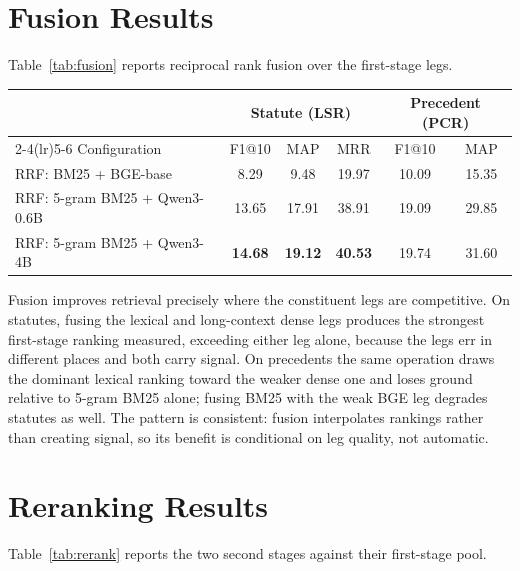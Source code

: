 \documentclass{mnnit}
\makeatletter
\newcommand{\tabcaption}[1]{\def\@captype{table}\caption{#1}}
\makeatother
\begin{document}
\section{Fusion Results}
Table~\ref{tab:fusion} reports reciprocal rank fusion over the
first-stage legs.

\begin{center}
\small
\tabcaption{Reciprocal rank fusion on the development split. The
fused pool is formed from each leg's top ranks at $k=60$.}
\label{tab:fusion}
\vspace{2mm}
\begin{tabular}{lccccc}
\toprule
 & \multicolumn{3}{c}{Statute (LSR)} & \multicolumn{2}{c}{Precedent (PCR)} \\
\cmidrule(lr){2-4}\cmidrule(lr){5-6}
Configuration & F1@10 & MAP & MRR & F1@10 & MAP \\
\midrule
RRF: BM25 + BGE-base & 8.29 & 9.48 & 19.97 & 10.09 & 15.35 \\
RRF: 5-gram BM25 + Qwen3-0.6B & 13.65 & 17.91 & 38.91 & 19.09 & 29.85 \\
RRF: 5-gram BM25 + Qwen3-4B & \textbf{14.68} & \textbf{19.12} & \textbf{40.53} & 19.74 & 31.60 \\
\bottomrule
\end{tabular}
\end{center}

Fusion improves retrieval precisely where the constituent legs
are competitive. On statutes, fusing the lexical and long-context
dense legs produces the strongest first-stage ranking measured,
exceeding either leg alone, because the legs err in different
places and both carry signal. On precedents the same operation
draws the dominant lexical ranking toward the weaker dense one
and loses ground relative to 5-gram BM25 alone; fusing BM25 with
the weak BGE leg degrades statutes as well. The pattern is
consistent: fusion interpolates rankings rather than creating
signal, so its benefit is conditional on leg quality, not
automatic.

\section{Reranking Results}
Table~\ref{tab:rerank} reports the two second stages against
their first-stage pool.
\end{document}
